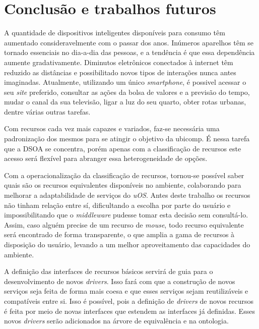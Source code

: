 \chapter{Conclusão e trabalhos futuros}

A quantidade de dispositivos inteligentes disponíveis para consumo têm aumentado consideravelmente com o passar dos anos. Inúmeros aparelhos têm se tornado essenciais no dia-a-dia das pessoas, e a tendência é que essa dependência aumente gradativamente. Diminutos eletrônicos conectados à internet têm reduzido as distâncias e possibilitado novos tipos de interações nunca antes imaginadas. Atualmente, utilizando um único \emph{smartphone}, é possivel acessar o seu \emph{site} preferido, consultar as ações da bolsa de valores e a previsão do tempo, mudar o canal da sua televisão, ligar a luz do seu quarto, obter rotas urbanas, dentre várias outras tarefas.
\begin{comment}
É nesse ambiente cada vez mais ubíquo que a classificação de recursos se insere: ambientes com dispositivos heterogêneos (móveis ou não) interagindo entre si, trocando informações ou utilizando capacidades características de cada aparelho.
\end{comment}

Com recursos cada vez mais capazes e variados, faz-se necessária uma padronização dos mesmos para se atingir o objetivo da ubicomp. É nessa tarefa que a DSOA se concentra, porém apenas com a classificação de recursos este acesso será flexível para abranger essa heterogeneidade de opções.

Com a operacionalização da classificação de recursos, tornou-se possível saber quais são os recursos equivalentes disponíveis no ambiente, colaborando para melhorar a adaptabilidade de serviços do \emph{uOS}. Antes deste trabalho os recursos não tinham relação entre sí, dificultando a escolha por parte do usuário e impossibilitando que o \emph{middleware} pudesse tomar esta decisão sem consultá-lo. Assim, caso alguém precise de um recurso de \emph{mouse}, todo recurso equivalente será encontrado de forma transparente, o que amplia a gama de recursos à disposição do usuário, levando a um melhor aproveitamento das capacidades do ambiente.

A definição das interfaces de recursos básicos servirá de guia para o desenvolvimento de novos \emph{drivers}. Isso fará com que a construção de novos serviços seja feita de forma mais coesa e que esses serviços sejam reutilizáveis e compatíveis entre si. Isso é possível, pois a definição de \emph{drivers} de novos recursos é feita por meio de novas interfaces que estendem as interfaces já definidas. Esses novos \emph{drivers} serão adicionados na árvore de equivalência e na ontologia.

